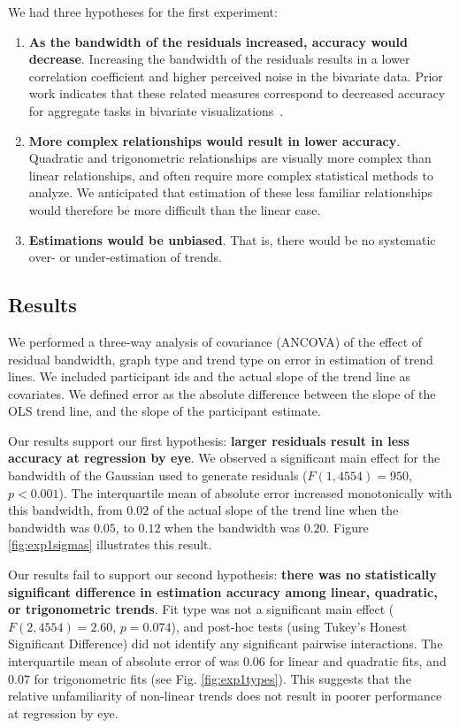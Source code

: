 \documentclass{sigchi}
\begin{document}
We had three hypotheses for the first experiment:
\begin{enumerate}
	\item \textbf{As the bandwidth of the residuals increased, accuracy would decrease}. Increasing the bandwidth of the residuals results in a lower correlation coefficient and higher perceived noise in the bivariate data. Prior work indicates that these related measures correspond to decreased accuracy for aggregate tasks in bivariate visualizations~\cite{albers2014task, harrison2014ranking}.
	\item \textbf{More complex relationships would result in lower accuracy}. Quadratic and trigonometric relationships are visually more complex than linear relationships, and often require more complex statistical methods to analyze. We anticipated that estimation of these less familiar relationships would therefore be more difficult than the linear case.
	\item \textbf{Estimations would be unbiased}. That is, there would be no systematic over- or under-estimation of trends.
\end{enumerate}

\subsection{Results}

\expOnesigmasFig

\expOnetypesFig

We performed a three-way analysis of covariance (ANCOVA) of the effect of residual bandwidth, graph type and trend type on error in estimation of trend lines. We included participant ids and the actual slope of the trend line as covariates. We defined error as the absolute difference between the slope of the OLS trend line, and the slope of the participant estimate.

Our results support our first hypothesis: \textbf{larger residuals result in less accuracy at regression by eye}.  We observed a significant main effect for the bandwidth of the Gaussian used to generate residuals ($F(1,4554)=950$, $p<0.001$). The interquartile mean of absolute error increased monotonically with this bandwidth, from $0.02$ of the actual slope of the trend line when the bandwidth was $0.05$, to $0.12$ when the bandwidth was $0.20$. Figure \ref{fig:exp1sigmas} illustrates this result.

Our results fail to support our second hypothesis: \textbf{there was no statistically significant difference in estimation accuracy among linear, quadratic, or trigonometric trends}. Fit type was not a significant main effect ($F(2,4554)=2.60$, $p=0.074$), and post-hoc tests (using Tukey's Honest Significant Difference) did not identify any significant pairwise interactions. The interquartile mean of absolute error of was $0.06$ for linear and quadratic fits, and $0.07$ for trigonometric fits (see Fig. \ref{fig:exp1types}). This suggests that the relative unfamiliarity of non-linear trends does not result in poorer performance at regression by eye.
\end{document}
